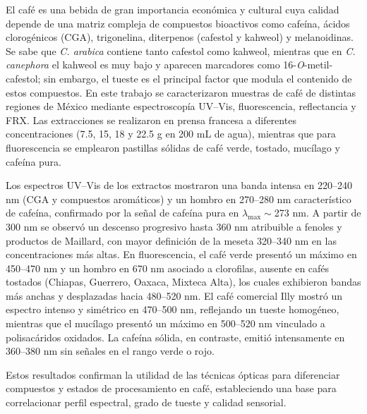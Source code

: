 \documentclass{article}
\newcommand{\PaperTitle}{}        %
\newcommand{\PaperAuthors}{}      %
\newcommand{\PaperAffils}{}       %
\newcommand{\PaperDates}{}        %
\newcommand{\PaperJournal}{}      %
\begin{document}
\begin{articleheader}
  {\small\PaperJournal\par}
  {\Large\bfseries \PaperTitle\par}
  \vspace{4pt}
  {\normalsize \PaperAuthors\par}
  {\footnotesize \PaperAffils\par}
  {\scriptsize \PaperDates\par}
\end{articleheader}

\begin{abstractbox}[title=\textbf{Resumen}]
El café es una bebida de gran importancia económica y cultural cuya calidad depende de una matriz compleja de compuestos bioactivos como cafeína, ácidos clorogénicos (CGA), trigonelina, diterpenos (cafestol y kahweol) y melanoidinas. Se sabe que \textit{C. arabica} contiene tanto cafestol como kahweol, mientras que en \textit{C. canephora} el kahweol es muy bajo y aparecen marcadores como 16-\textit{O}-metil-cafestol; sin embargo, el tueste es el principal factor que modula el contenido de estos compuestos. En este trabajo se caracterizaron muestras de café de distintas regiones de México mediante espectroscopía UV–Vis, fluorescencia, reflectancia y FRX. Las extracciones se realizaron en prensa francesa a diferentes concentraciones (7.5, 15, 18 y 22.5 g en 200 mL de agua), mientras que para fluorescencia se emplearon pastillas sólidas de café verde, tostado, mucílago y cafeína pura.  

Los espectros UV–Vis de los extractos mostraron una banda intensa en 220--240 nm (CGA y compuestos aromáticos) y un hombro en 270--280 nm característico de cafeína, confirmado por la señal de cafeína pura en $\lambda_{\max}\sim$273 nm. A partir de 300 nm se observó un descenso progresivo hasta 360 nm atribuible a fenoles y productos de Maillard, con mayor definición de la meseta 320--340 nm en las concentraciones más altas. En fluorescencia, el café verde presentó un máximo en 450--470 nm y un hombro en 670 nm asociado a clorofilas, ausente en cafés tostados (Chiapas, Guerrero, Oaxaca, Mixteca Alta), los cuales exhibieron bandas más anchas y desplazadas hacia 480--520 nm. El café comercial Illy mostró un espectro intenso y simétrico en 470--500 nm, reflejando un tueste homogéneo, mientras que el mucílago presentó un máximo en 500--520 nm vinculado a polisacáridos oxidados. La cafeína sólida, en contraste, emitió intensamente en 360--380 nm sin señales en el rango verde o rojo.  

Estos resultados confirman la utilidad de las técnicas ópticas para diferenciar compuestos y estados de procesamiento en café, estableciendo una base para correlacionar perfil espectral, grado de tueste y calidad sensorial.
\end{abstractbox}
\end{document}
